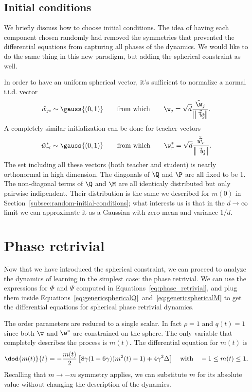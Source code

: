 \subsection{Initial conditions} \label{subsec:initial-condition-phaseretrivial}
We briefly discuss how to choose initial conditions.
The idea of having each component chosen randomly had removed the symmetries that prevented the differential equations from capturing all phases of the dynamics.
We would like to do the same thing in this new paradigm, but adding the spherical constraint as well.

In order to have an uniform spherical vector, it's sufficient to normalize a normal i.i.d. vector
\[
  \tilde{w}_{ji} \sim \gauss{(0,1)}\qquad\text{from which}\qquad \w_{j} = \sqrt{d}\frac{\tilde{\w}_{j}}{\left\|\tilde{\vec{w}_j}\right\|}.
\]
A completely similar initialization can be done for teacher vectors
\[
  \tilde{w}^*_{ri} \sim \gauss{(0,1)}\qquad\text{from which}\qquad \w^*_{r} = \sqrt{d}\frac{\tilde{\vec{w}}_{r}}{\left\|\tilde{\vec{w}_j}\right\|}.
\]
The set including all these vectors (both teacher and student) is nearly orthonormal in high dimension.
The diagonals of \(\Q\) and \(\P\) are all fixed to be 1. The non-diagonal terms of \(\Q\) and \(\M\) are all identicaly
distributed but only pairwise indipendent. Their distribution is the same we described for \(m(0)\) in Section~\ref{subsec:random-initial-conditions};
what interests us is that in the \(d\to\infty\) limit we can approximate it as a Gaussian with zero mean and variance \(1/d\).

\section{Phase retrivial}
Now that we have introduced the spherical constraint,
we can proceed to analyze the dynamics of learning in the simplest case: the phase retrivial.
We can use the expressions for \(\Phi\) and \(\Psi\) computed in Equations~\eqref{eq:phase_retrivial},
and plug them inside Equations~\eqref{eq:genericsphericalQ}~and~\eqref{eq:genericsphericalM} to get the 
differential equations for spherical phase retrivial dynamics.

The order parameters are reduced to a single scalar.
In fact \(\rho=1\) and \(q(t)=1\) since both \(\w\) and \(\w^*\) are constrained on the sphere.
The only variable that completely describes the process is \(m(t)\).
The differential equation for \(m(t)\) is
\begin{equation} \label{eq:spherical-phaseretrivial}
  \dod{m{(t)}}{t} = -\frac{m{(t)}}{2}\left[8\gamma(1-6\gamma)(m^2{(t)}-1)+4\gamma^2\Delta\right]\quad\text{with}\quad
  -1\le m(t)\le 1.
\end{equation}
Recalling that \(m\to-m\) symmetry applies,
we can substitute \(m\) for its absolute value without changing the description of the dynamics.

